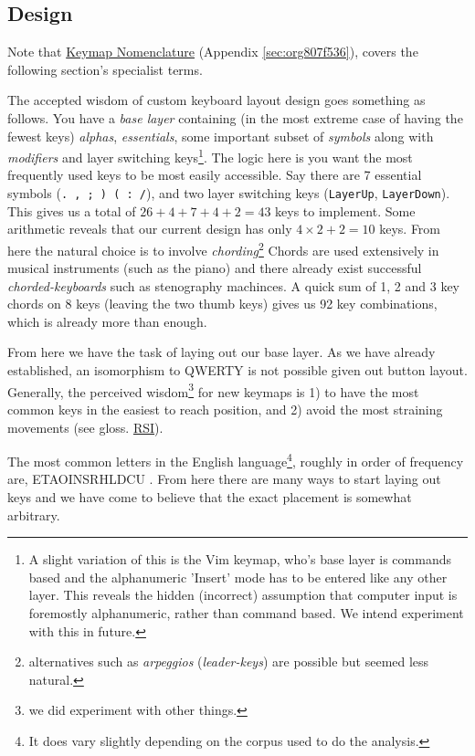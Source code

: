 \documentclass[logo,bsc,singlespacing,parskip]{infthesis}
\begin{document}
\subsection{Design}
\label{sec:orgeeae4e6}
Note that \hyperref[sec:org807f536]{Keymap Nomenclature} (Appendix \ref{sec:org807f536}), covers the following section's specialist terms.

The accepted wisdom of custom keyboard layout design goes something as follows.
You have a \emph{base layer} containing (in the most extreme case of having the fewest keys) \emph{alphas}, \emph{essentials}, some important subset of \emph{symbols} along with \emph{modifiers} and layer switching keys\footnote{A slight variation of this is the Vim \autocite{WelcomeHomeVim} keymap, who's base layer is commands based and the alphanumeric 'Insert' mode has to be entered like any other layer. This reveals the hidden (incorrect) assumption that computer input is foremostly alphanumeric, rather than command based. We intend experiment with this in future.}.
The logic here is you want the most frequently used keys to be most easily accessible.
Say there are 7 essential symbols (\texttt{. , ; ) ( : /}), and two layer switching keys (\texttt{LayerUp}, \texttt{LayerDown}).
This gives us a total of \(26+4+7+4+2=43\) keys to implement.
Some arithmetic reveals that our current design has only \(4\times2 + 2 = 10\) keys.
From here the natural choice is to involve \emph{chording}\footnote{alternatives such as \emph{arpeggios} (\emph{leader-keys}) are possible but seemed less natural.}
Chords are used extensively in musical instruments (such as the piano) and there already exist successful \emph{chorded-keyboards} such as stenography machinces.
A quick sum of 1, 2 and 3 key chords on 8 keys (leaving the two thumb keys) gives us 92 key combinations, which is already more than enough.

From here we have the task of laying out our base layer.
As we have already established, an isomorphism to QWERTY is not possible given out button layout.
Generally, the perceived wisdom\footnote{we did experiment with other things.} for new keymaps is 1) to have the most common keys in the easiest to reach position, and 2) avoid the most straining movements (see gloss. \hyperref[org77f0234]{RSI}).

The most common letters in the English language\footnote{It does vary slightly depending on the corpus used to do the analysis.}, roughly in order of frequency are, ETAOINSRHLDCU \autocite{norvigEnglishLetterFrequency}.
From here there are many ways to start laying out keys and we have come to believe that the exact placement is somewhat arbitrary.
\end{document}
